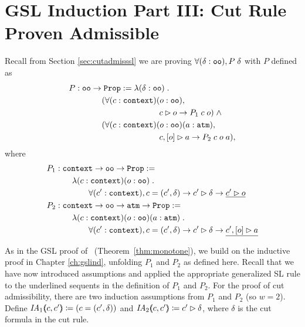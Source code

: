 \section{GSL Induction Part III: Cut Rule Proven Admissible}
\label{sec:cutadmiss}


Recall from Section \ref{sec:cutadmisssl} we are proving $\forall (\delta : \sltm{oo}), P \; \delta$ with $P$ defined as
\begin{align*}
& P : \sltm{oo} \rightarrow \hybridtm{Prop} := \lambda (\delta : \sltm{oo}) \; . \\
& \qquad\qquad (\forall (c : \sltm{context}) (o : \sltm{oo}), \\
& \qquad\qquad\qquad\qquad\qquad\quad \seqsl[c]{o} \rightarrow P_1 \; c \; o) \; \wedge \\
& \qquad\qquad (\forall (c : \sltm{context}) (o : \sltm{oo}) (a : \hybridtm{atm}), \\
& \qquad\qquad\qquad\qquad\qquad\quad \bchsl[c]{o}{a} \rightarrow P_2 \; c \; o \; a),
\end{align*}
where
\begin{align*}
P_1 &: \sltm{context} \rightarrow \sltm{oo} \rightarrow \coqtm{Prop} := \\
& \qquad \lambda (c : \sltm{context}) (o : \sltm{oo}) \; . \\
& \qquad\qquad \forall (\inddyncon{} : \sltm{context}), c = (\inddyncon{}, \delta) \rightarrow \seqsl[\inddyncon{}]{\delta} \rightarrow \underline{\seqsl[\inddyncon{}]{o}} \\
P_2 &: \sltm{context} \rightarrow \sltm{oo} \rightarrow \sltm{atm} \rightarrow \coqtm{Prop} := \\
& \qquad \lambda (c : \sltm{context}) (o : \sltm{oo}) (a : \sltm{atm}) \; . \\
& \qquad\qquad \forall (\inddyncon{} : \sltm{context}), c = (\inddyncon{}, \delta) \rightarrow \seqsl[\inddyncon{}]{\delta} \rightarrow \underline{\bchsl[\inddyncon{}]{o}{a}}
\end{align*}

As in the GSL proof of~ (Theorem~\ref{thm:monotone}), we build on the inductive proof in Chapter \ref{ch:gslind}, unfolding $P_1$ and $P_2$ as defined here.
Recall that we have now introduced assumptions and applied the appropriate generalized SL rule to the underlined sequents in the definition of $P_1$ and $P_2$. For the proof of cut admissibility, there are two induction assumptions from $P_1$ and $P_2$ (so $w = 2$). Define $\mathit{IA}_1 \args{c , \inddyncon{}} \coloneqq (c = (\inddyncon{} , \delta))$ and $\mathit{IA}_2 \args{c , \inddyncon{}} \coloneqq \seqsl[\inddyncon{}]{\delta}$, where $\delta$ is the cut formula in the cut rule.


